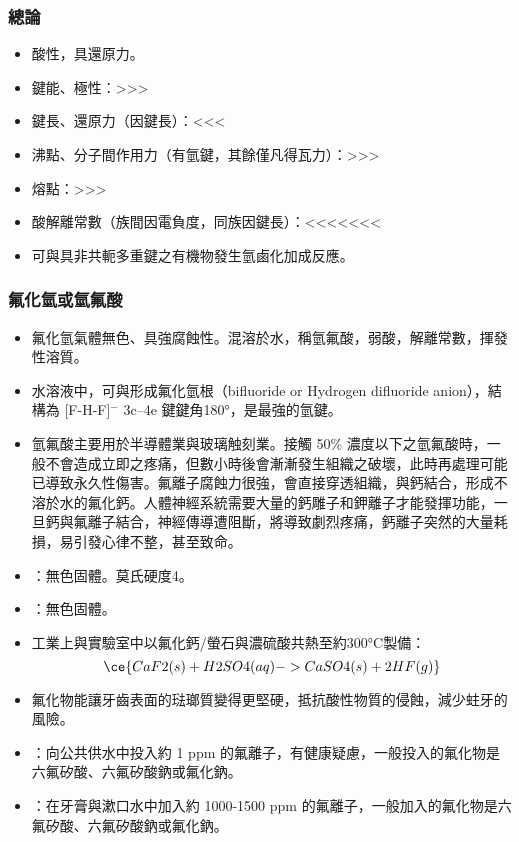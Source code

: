 \documentclass[a4paper,12pt]{report}
\begin{document}
\subsubsection{總論}
\begin{itemize}
\item 酸性，具還原力。
\item 鍵能、極性：>>>
\item 鍵長、還原力（因鍵長）：<<<
\item 沸點、分子間作用力（有氫鍵，其餘僅凡得瓦力）：>>>
\item 熔點：>>>
\item 酸解離常數（族間因電負度，同族因鍵長）：<<<<<<<
\item 可與具非共軛多重鍵之有機物發生氫鹵化加成反應。
\end{itemize}
\subsubsection{氟化氫或氫氟酸}
\begin{itemize}
\item 氟化氫氣體無色、具強腐蝕性。混溶於水，稱氫氟酸，弱酸，解離常數，揮發性溶質。
\item 水溶液中，可與形成氟化氫根（bifluoride or Hydrogen difluoride anion），結構為 [F-H-F]$^-$ 3c–4e 鍵鍵角180°，是最強的氫鍵。
\item 氫氟酸主要用於半導體業與玻璃触刻業。接觸 50\% 濃度以下之氫氟酸時，一般不會造成立即之疼痛，但數小時後會漸漸發生組織之破壞，此時再處理可能已導致永久性傷害。氟離子腐蝕力很強，會直接穿透組織，與鈣結合，形成不溶於水的氟化鈣。人體神經系統需要大量的鈣雕子和鉀離子才能發揮功能，一旦鈣與氟離子結合，神經傳導遭阻斷，將導致劇烈疼痛，鈣離子突然的大量耗損，易引發心律不整，甚至致命。
\item {}：無色固體。莫氏硬度4。
\item {}：無色固體。
\item 工業上與實驗室中以氟化鈣/螢石與濃硫酸共熱至約300°C製備：
\[\ce{CaF2(s) + H2SO4(aq) -> CaSO4(s) + 2HF(g)}\]
\item 氟化物能讓牙齒表面的琺瑯質變得更堅硬，抵抗酸性物質的侵蝕，減少蛀牙的風險。
\item {}：向公共供水中投入約 1 ppm 的氟離子，有健康疑慮，一般投入的氟化物是六氟矽酸、六氟矽酸鈉或氟化鈉。
\item {}：在牙膏與漱口水中加入約 1000-1500 ppm 的氟離子，一般加入的氟化物是六氟矽酸、六氟矽酸鈉或氟化鈉。
\end{itemize}
\end{document}
